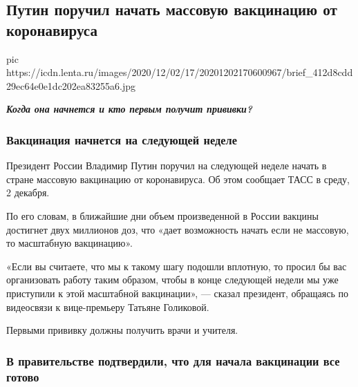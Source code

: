  
 
 
 
 
 
\subsection{Путин поручил начать массовую вакцинацию от коронавируса}
\label{sec:03_12_2020.news.ru.lenta_ru.2.putin_vaccination_start}

\ifcmt
pic https://icdn.lenta.ru/images/2020/12/02/17/20201202170600967/brief_412d8cdd29ec64e0e1dc202ea83255a6.jpg
\fi

\begin{center}
\bfseries\em\Large\color{orange}
Когда она начнется и кто первым получит прививки?
\end{center}

\subsubsection{Вакцинация начнется на следующей неделе}

Президент России Владимир Путин поручил на следующей неделе начать в стране
массовую вакцинацию от коронавируса. Об этом сообщает ТАСС в среду, 2 декабря.

По его словам, в ближайшие дни объем произведенной в России вакцины достигнет
двух миллионов доз, что «дает возможность начать если не массовую, то
масштабную вакцинацию».

«Если вы считаете, что мы к такому шагу подошли вплотную, то просил бы вас
организовать работу таким образом, чтобы в конце следующей недели мы уже
приступили к этой масштабной вакцинации», — сказал президент, обращаясь по
видеосвязи к вице-премьеру Татьяне Голиковой.

Первыми прививку должны получить врачи и учителя.

\subsubsection{В правительстве подтвердили, что для начала вакцинации все готово}

